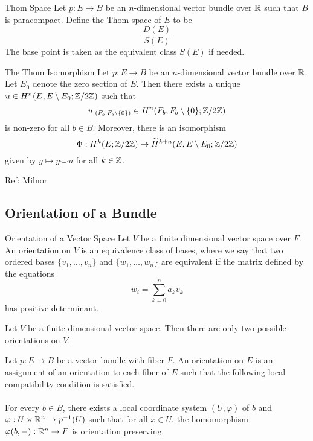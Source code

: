 \documentclass[a4paper]{article}
\begin{document}
\begin{defn}{Thom Space}{} Let $p:E\to B$ be an $n$-dimensional vector bundle over $\mathbb{R}$ such that $B$ is paracompact. Define the Thom space of $E$ to be $$\frac{D(E)}{S(E)}$$ The base point is taken as the equivalent class $S(E)$ if needed. 
\end{defn}

\begin{thm}{The Thom Isomorphism}{} Let $p:E\to B$ be an $n$-dimensional vector bundle over $\mathbb{R}$. Let $E_0$ denote the zero section of $E$. Then there exists a unique $u\in H^n(E,E\setminus E_0;\mathbb{Z}/2\mathbb{Z})$ such that $$u|_{(F_b,F_b\setminus\{0\})}\in H^n(F_b,F_b\setminus\{0\};\mathbb{Z}/2\mathbb{Z})$$ is non-zero for all $b\in B$. Moreover, there is an isomorphism $$\Phi:H^k(E;\mathbb{Z}/2\mathbb{Z})\to\widetilde{H}^{k+n}(E,E\setminus E_0;\mathbb{Z}/2\mathbb{Z})$$ given by $y\mapsto y\smile u$ for all $k\in\mathbb{Z}$. 
\end{thm}

Ref: Milnor

\subsection{Orientation of a Bundle}
\begin{defn}{Orientation of a Vector Space}{} Let $V$ be a finite dimensional vector space over $F$. An orientation on $V$ is an equivalence class of bases, where we say that two ordered bases $\{v_1,\dots,v_n\}$ and $\{w_1,\dots,w_n\}$ are equivalent if the matrix defined by the equations $$w_i=\sum_{k=0}^na_kv_k$$ has positive determinant. 
\end{defn}

\begin{lmm}{}{} Let $V$ be a finite dimensional vector space. Then there are only two possible orientations on $V$. 
\end{lmm}

\begin{defn}{}{} Let $p:E\to B$ be a vector bundle with fiber $F$. An orientation on $E$ is an assignment of an orientation to each fiber of $E$ such that the following local compatibility condition is satisfied. \\~\\

For every $b\in B$, there exists a local coordinate system $(U,\varphi)$ of $b$ and $\varphi:U\times\mathbb{R}^n\to p^{-1}(U)$ such that for all $x\in U$, the homomorphism $\varphi(b,-):\mathbb{R}^n\to F$ is orientation preserving. 
\end{defn}
\end{document}
